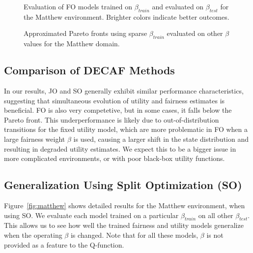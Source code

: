 \begin{figure}[t]
    \centering
    \caption{Evaluation of FO models trained on $\beta_{train}$ and evaluated on $\beta_{test}$ for the Matthew environment. Brighter colors indicate better outcomes.}
    \label{fig:matthew_FO}
\end{figure}
\begin{figure}[t]
    \centering
    \caption{Approximated Pareto fronts using sparse $\beta_{train}$ evaluated on other $\beta$ values for the Matthew domain.}
    \label{fig:matthew_apprx_Pareto}
\end{figure}

\subsection{Comparison of DECAF Methods}
In our results, JO and SO generally exhibit similar performance characteristics, suggesting that simultaneous evolution of utility and fairness estimates is beneficial. FO is also very competetive, but in some cases, it falls below the Pareto front.
This underperformance is likely due to out-of-distribution transitions for the fixed utility model, which are more problematic in FO when a large fairness weight $\beta$ is used, causing a larger shift in the state distribution and resulting in degraded utility estimates. We expect this to be a bigger issue in more complicated environments, or with poor black-box utility functions.

\subsection{Generalization Using Split Optimization (SO)}
Figure~\ref{fig:matthew} shows detailed results for the Matthew environment, when using SO. We evaluate each model trained on a particular $\beta_{train}$ on all other $\beta_{test}$. This allows us to see how well the trained fairness and utility models generalize when the operating $\beta$ is changed. Note that for all these models, $\beta$ is not provided as a feature to the Q-function. 

